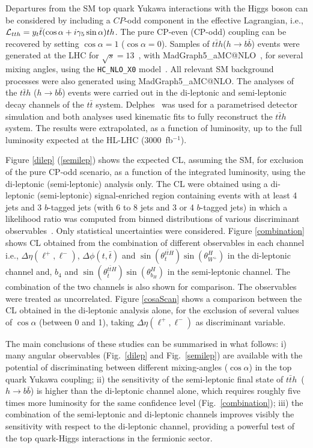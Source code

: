\documentclass[../report.tex]{subfiles}
\begin{document}
Departures from the SM top quark Yukawa interactions with the Higgs boson can be considered by including a $CP$-odd component in the effective Lagrangian, i.e., ${\cal L}_{tth}=y_t\bar t (\cos\alpha+i\gamma_5\sin\alpha)t h$. The pure CP-even (CP-odd) coupling can be recovered by setting $\cos\alpha=1$ ($\cos\alpha=0$). Samples of $t\bar t h$($h\rightarrow b\bar{b}$) events were generated at the LHC for $\sqrt{s}=13$~\UTeV, with {\sc MadGraph5\_aMC@NLO}~\cite{Alwall:2014hca}, for several mixing angles, using the \texttt{HC\_NLO\_X0} model~\cite{Artoisenet:2013puc}. All relevant SM background processes were also generated using {\sc MadGraph5\_aMC@NLO}. The analyses of the $t\bar t h$ ($h\rightarrow b\bar b$) events were carried out in the di-leptonic and semi-leptonic decay channels of the $t\bar t$ system. Delphes~\cite{deFavereau:2013fsa} was used for a parametrised detector simulation and both analyses used kinematic fits to fully reconstruct the $t\bar t h$ system. The results were extrapolated, as a function of luminosity, up to the full luminosity expected at the HL-LHC (3000~fb$^{-1}$).

Figure \ref{dilep} (\ref{semilep}) shows the expected CL, assuming the SM, for exclusion of the pure CP-odd scenario, as a function of the integrated luminosity, using the di-leptonic (semi-leptonic) analysis only. 
The CL were obtained using a di-leptonic (semi-leptonic) signal-enriched region containing events with at least 4 jets and 3 $b$-tagged jets (with 6 to 8 jets and 3 or 4 $b$-tagged jets) in which a likelihood ratio was computed from binned distributions of various discriminant observables~\cite{AmorDosSantos:2017ayi,Azevedo:2017qiz,Demartin:2014fia}. 
Only statistical uncertainties were considered. Figure \ref{combination} shows CL obtained from the combination of different observables in each channel i.e., $\Delta\eta(\ell^+,\ell^-)$, $\Delta\phi(t,\bar t)$ and $\sin(\theta^{t\bar tH}_{t})\sin(\theta^{H}_{W^+})$ in the di-leptonic channel and, $b_4$ and $\sin(\theta^{t\bar tH}_{\bar t})\sin(\theta^{H}_{b_H})$ in the semi-leptonic channel. The combination of the two channels is also shown for comparison. The observables were treated as uncorrelated. Figure \ref{cosaScan} shows a comparison between the CL obtained in the di-leptonic analysis alone, for the exclusion of several values of $\cos\alpha$ (between 0 and 1), taking $\Delta\eta(\ell^+,\ell^-)$ as discriminant variable.

The main conclusions of these studies can be summarised in what follows: i) many angular observables (Fig.~\ref{dilep} and Fig.~\ref{semilep}) are available with the potential of discriminating between different mixing-angles ($\cos\alpha$) in the top quark Yukawa coupling; ii) the sensitivity of the semi-leptonic final state of $t\bar{t}h$~($h\rightarrow b\bar{b}$) is higher than the di-leptonic channel alone, which requires roughly five times more luminosity for the same confidence level (Fig.~\ref{combination}); iii) the combination of the semi-leptonic and di-leptonic channels improves visibly the sensitivity with respect to the di-leptonic channel, providing a powerful test of the top quark-Higgs interactions in the fermionic sector.
\end{document}
